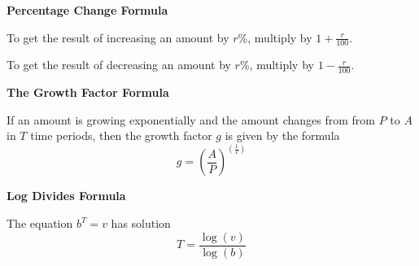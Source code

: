 \documentclass[12pt]{article}
\begin{document}
 \hrulefill
 
  \begin{center}
\textbf{Percentage Change Formula}
\vspace{.1in}

To get the result of increasing an amount by $r$\%, multiply by $1+\frac{r}{100}.$
\vspace{.1in}

To get the result of decreasing an amount by $r$\%, multiply by $1-\frac{r}{100}.$
 \end{center}
 
  \vspace{.1in}
    \hrulefill
 \vspace{.1in}
 
 \begin{center}
\textbf{The Growth Factor Formula}
\vspace{.1in}

If an amount is growing exponentially and the amount changes from from $P$ to $A$ \\ in $T$ time periods, then the growth factor $g$ is given by the formula $$g=\left(\frac{A}{P}\right)^{\left(\frac{1}{T}\right)}$$

 \end{center}
 
  \vspace{.1in}
    \hrulefill
 \vspace{.1in}
 
 \begin{center}
 \textbf{Log Divides Formula}
 \vspace{.1 in}
 
 The equation $b^T=v$ has solution $$T=\frac{\log(v)}{\log(b)}$$
 
 \end{center}

\hrulefill
\end{document}
